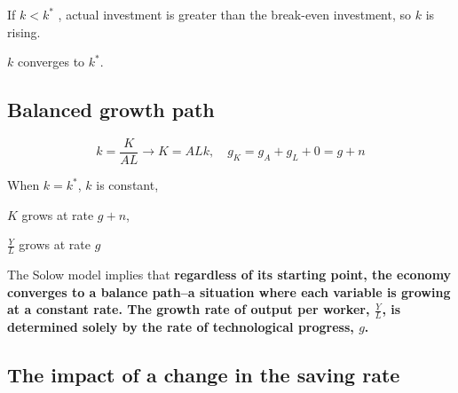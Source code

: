 \documentclass[12pt]{article}
\begin{document}
\begin{figure}[H]
\end{figure}

If $ k < k ^{*} $ , actual investment is greater than the break-even investment, so
$ k $ is rising.

$ k $ converges to $ k ^{*} $.


\subsection{Balanced growth path}

\begin{equation*}
k = \frac{K}{AL} \rightarrow K = ALk, \quad g_{K} = g_{A} + g_{L} + 0 = g + n
\end{equation*}

When $ k = k ^{*} $, $ k $ is constant,

$ K $ grows at rate $ g + n $,

$ \frac{Y}{L} $ grows at rate $ g $

The Solow model implies that {\textbf {regardless of its starting point, the economy
converges to a balance path--a situation where each variable is growing at a constant
rate. The growth rate of output per worker, $ \frac{Y}{L} $, is determined solely
by the rate of technological progress, $ g $.}}


\subsection{The impact of a change in the saving rate}
\end{document}
